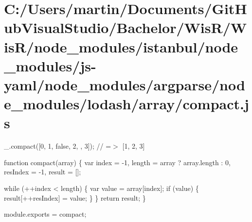 \hypertarget{_c_1_2_users_2martin_2_documents_2_git_hub_visual_studio_2_bachelor_2_wis_r_2_wis_r_2node_module79886eaa68f1d4e1aeeec1740f9c7e51}{}\section{C\+:/\+Users/martin/\+Documents/\+Git\+Hub\+Visual\+Studio/\+Bachelor/\+Wis\+R/\+Wis\+R/node\+\_\+modules/istanbul/node\+\_\+modules/js-\/yaml/node\+\_\+modules/argparse/node\+\_\+modules/lodash/array/compact.\+js}
\+\_\+.\+compact(\mbox{[}0, 1, false, 2, \textquotesingle{}\textquotesingle{}, 3\mbox{]}); // =$>$ \mbox{[}1, 2, 3\mbox{]}


\begin{DoxyCodeInclude}

\textcolor{keyword}{function} compact(array) \{
  var index = -1,
      length = array ? array.length : 0,
      resIndex = -1,
      result = [];

  \textcolor{keywordflow}{while} (++index < length) \{
    var value = array[index];
    \textcolor{keywordflow}{if} (value) \{
      result[++resIndex] = value;
    \}
  \}
  \textcolor{keywordflow}{return} result;
\}

module.exports = compact;
\end{DoxyCodeInclude}
 